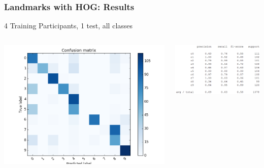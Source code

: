 \documentclass{beamer}
\begin{document}
	\begin{frame}
		\frametitle{Landmarks with HOG: Results}
		4 Training Participants, 1 test, all classes
		\begin{columns}
			\begin{column}{0.5\textwidth}
				\begin{center}
					\includegraphics[width=\textwidth]{mult_HOG/4c0123456789matComparable}\\			
				\end{center}
			\end{column}
			\begin{column}{0.5\textwidth}
				\begin{center}
					\includegraphics[width=\textwidth]{mult_HOG/4c0123456789repComparable}
				\end{center}
			\end{column}
		\end{columns}		
	\end{frame}
	
\end{document}
